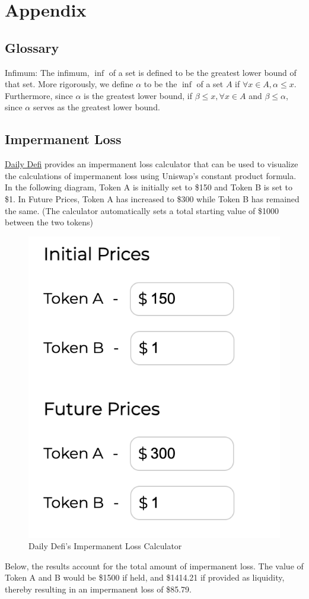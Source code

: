 \documentclass[12pt]{article}
\begin{document}
\section*{Appendix}

\subsection{Glossary}\label{subsec:glossary}
Infimum: The infimum, \(\inf\) of a set is defined to be the greatest lower bound of that set. More rigorously, we define \(\alpha\) to be the \(\inf\) of a set \(A\) if \(\forall x \in A, \alpha \leq x.\)
Furthermore, since \(\alpha\) is the greatest lower bound, if \(\beta \leq x, \forall x \in A\) and \(\beta \leq \alpha\), since \(\alpha\) serves as the greatest lower bound.

\subsection{Impermanent Loss}\label{subsec:impermanent}
\href{https://dailydefi.org/tools/impermanent-loss-calculator/}{Daily Defi} provides an impermanent loss calculator that can be used to visualize the calculations of impermanent loss using Uniswap's constant product formula.
In the following diagram, Token A is initially set to \$150 and Token B is set to \$1. In Future Prices, Token A has increased to \$300 while Token B has remained the same. (The calculator automatically sets a total starting value of \$1000 between the two tokens)
\begin{figure}[H]
    \centering
    \includegraphics[width=0.4\linewidth]{impermanent_loss.png}
    \caption{Daily Defi's Impermanent Loss Calculator}
    \label{fig:impermanent_loss}
\end{figure}

Below, the results account for the total amount of impermanent loss. The value of Token A and B would be \$1500 if held, and \$1414.21 if provided as liquidity, thereby resulting in an impermanent loss of \$85.79.
\end{document}
